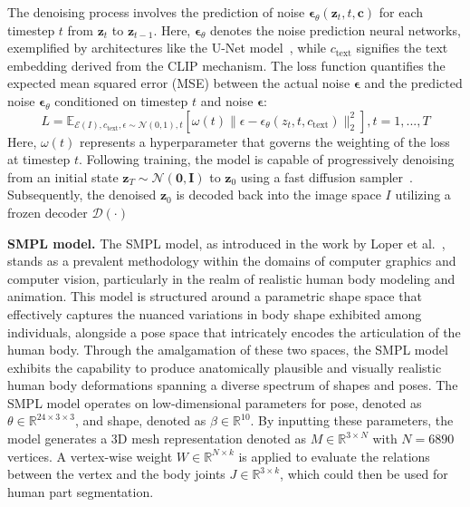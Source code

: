 The denoising process involves the prediction of noise $\boldsymbol{\epsilon}_{\theta}(\boldsymbol{z}_t,t,\boldsymbol{c})$ for each timestep $t$ from $\boldsymbol{z}_t$ to $\boldsymbol{z}_{t-1}$.
Here, $\boldsymbol{\epsilon}_{\theta}$ denotes the noise prediction neural networks, exemplified by architectures like the U-Net model~\cite{ronneberger2015u}, while $c_{\text{text}}$ signifies the text embedding derived from the CLIP mechanism.
The loss function quantifies the expected mean squared error (MSE) between the actual noise $\boldsymbol{\epsilon}$ and the predicted noise $\boldsymbol{\epsilon}_{\theta}$ conditioned on timestep $t$ and noise $\boldsymbol{\epsilon}$:
\begin{equation}
    L = \mathbb{E}_{\mathcal{E}(I), c_{\text{text}},\epsilon\sim\mathcal{N}(0,1),t}\left[\omega(t) \lVert \epsilon-\epsilon_{\theta}(z_t, t, c_{\text{text}}) \rVert_{2}^{2} \right], t=1,...,T
\end{equation}
Here, $\omega(t)$ represents a hyperparameter that governs the weighting of the loss at timestep $t$. 
Following training, the model is capable of progressively denoising from an initial state $\boldsymbol{z}_T \sim \mathcal{N}(\boldsymbol{0},\boldsymbol{I})$ to $\boldsymbol{z}_0$ using a fast diffusion sampler~\cite{song2020denoising, lu2022dpm}.
Subsequently, the denoised $\boldsymbol{z}_0$ is decoded back into the image space $I$ utilizing a frozen decoder $\mathcal{D}(\cdot)$

\textbf{SMPL model.} 
The SMPL model, as introduced in the work by Loper et al.~\cite{SMPL:2015}, stands as a prevalent methodology within the domains of computer graphics and computer vision, particularly in the realm of realistic human body modeling and animation. 
This model is structured around a parametric shape space that effectively captures the nuanced variations in body shape exhibited among individuals, alongside a pose space that intricately encodes the articulation of the human body. 
Through the amalgamation of these two spaces, the SMPL model exhibits the capability to produce anatomically plausible and visually realistic human body deformations spanning a diverse spectrum of shapes and poses.
The SMPL model operates on low-dimensional parameters for pose, denoted as $\theta \in \mathbb{R}^{24 \times 3 \times 3}$, and shape, denoted as $\beta \in \mathbb{R}^{10}$.
By inputting these parameters, the model generates a 3D mesh representation denoted as $M \in \mathbb{R}^{3 \times N}$ with $N = 6890$ vertices. 
A vertex-wise weight $W \in \mathbb{R}^{N \times k}$ is applied to evaluate the relations between the vertex and the body joints $J \in \mathbb{R}^{3 \times k}$, which could then be used for human part segmentation.

